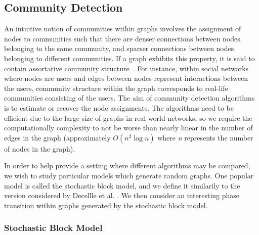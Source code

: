 \documentclass[12pt]{article}
\numberwithin{equation}{section}
\begin{document}
\subsection{Community Detection}
\label{sec:background;subsec:communityDetection}

An intuitive notion of communities within graphs involves the assignment of nodes to communities such that there are denser connections between nodes belonging to the same community, and sparser connections between nodes belonging to different communities. If a graph exhibits this property, it is said to contain assortative community structure~\cite{New06a,DKM+13,For10,New06b}. For instance, within social networks where nodes are users and edges between nodes represent interactions between the users, community structure within the graph corresponds to real-life communities consisting of the users. The aim of community detection algorithms is to estimate or recover the node assignments. The algorithms need to be efficient due to the large size of graphs in real-world networks, so we require the computationally complexity to not be worse than nearly linear in the number of edges in the graph (approximately $O(n^{2}\log n)$ where \textsl{n} represents the number of nodes in the graph).

In order to help provide a setting where different algorithms may be compared, we wish to study particular models which generate random graphs. One popular model is called the stochastic block model, and we define it similarily to the version considered by Decellle et al. \cite{DKM+13}. We then consider an interesting phase transition within graphs generated by the stochastic block model.

\subsubsection{Stochastic Block Model}
\label{sec:background;subsec:communityDetection;subsubsec:stochasticBlockModel}
\end{document}
